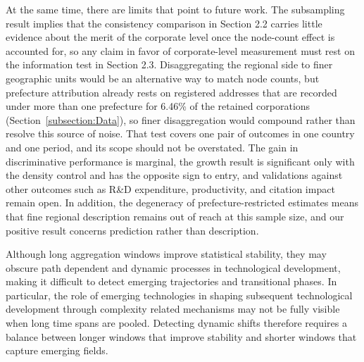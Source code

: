 \documentclass[lineno,pdflatex,sn-mathphys-num]{sn-jnl}%
\theoremstyle{thmstyleone}%
\theoremstyle{thmstyletwo}%
\theoremstyle{thmstylethree}%
\begin{document}
At the same time, there are limits that point to future work.
The subsampling result implies that the consistency comparison in Section 2.2 carries little evidence about the merit of the corporate level once the node-count effect is accounted for, so any claim in favor of corporate-level measurement must rest on the information test in Section 2.3.
Disaggregating the regional side to finer geographic units would be an alternative way to match node counts, but prefecture attribution already rests on registered addresses that are recorded under more than one prefecture for 6.46\% of the retained corporations (Section~\ref{subsection:Data}), so finer disaggregation would compound rather than resolve this source of noise.
That test covers one pair of outcomes in one country and one period, and its scope should not be overstated.
The gain in discriminative performance is marginal, the growth result is significant only with the density control and has the opposite sign to entry, and validations against other outcomes such as R\&D expenditure, productivity, and citation impact remain open.
In addition, the degeneracy of prefecture-restricted estimates means that fine regional description remains out of reach at this sample size, and our positive result concerns prediction rather than description.

Although long aggregation windows improve statistical stability, they may obscure path dependent and dynamic processes in technological development, making it difficult to detect emerging trajectories and transitional phases.
In particular, the role of emerging technologies in shaping subsequent technological development through complexity related mechanisms \cite{juhasz2021explaining} may not be fully visible when long time spans are pooled.
Detecting dynamic shifts therefore requires a balance between longer windows that improve stability and shorter windows that capture emerging fields.
\end{document}
